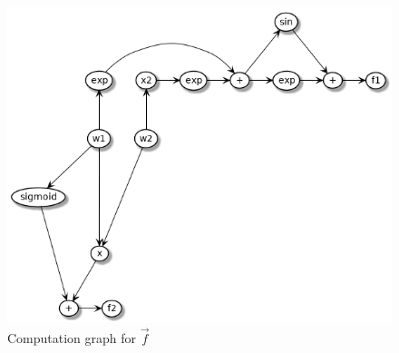 
\begin{figure}
    \begin{center}
        \includegraphics[width=0.9\linewidth]{../2_automatocDifferentiation/computation_graph.png}
        \caption{Computation graph for $\vec{f}$}
    \end{center}
\end{figure}